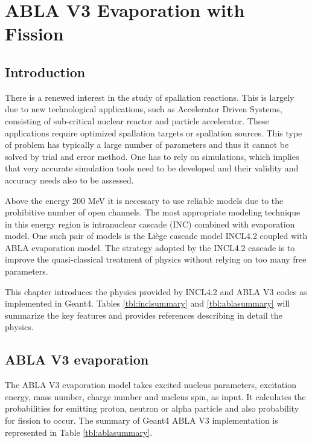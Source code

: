\chapter{ABLA V3 Evaporation with Fission}

\section{Introduction}

There is a renewed interest in the study of spallation reactions. This
is largely due to new technological applications, such as Accelerator
Driven Systems, consisting of sub-critical nuclear reactor and
particle accelerator. These applications require optimized spallation
targets or spallation sources. This type of problem has typically a large number
of parameters and thus it cannot be solved by trial and error
method. One has to rely on simulations, which implies that very
accurate simulation tools need to be developed and their validity and
accuracy needs also to be assessed.

Above the energy 200 MeV it is necessary to use reliable models due to
the prohibitive number of open channels. The most appropriate modeling
technique in this energy region is intranuclear cascade (INC) combined
with evaporation model. One such pair of models is the Li\`ege cascade
model INCL4.2 coupled with ABLA evaporation model. The strategy adopted
by the INCL4.2 cascade is to improve the quasi-classical treatment of
physics without relying on too many free parameters. 

This chapter introduces the physics provided by INCL4.2 and ABLA V3 codes as implemented in Geant4.
Tables \ref{tbl:inclsummary} and \ref{tbl:ablasummary} will summarize the key features 
and provides references describing in detail the physics.


\section{ABLA V3 evaporation}

The ABLA V3 evaporation model takes excited nucleus parameters,
excitation energy, mass number, charge number and nucleus spin, as
input. It calculates the probabilities for emitting proton, neutron or
alpha particle and also probability for fission to occur. 
The summary of Geant4 ABLA V3 implementation is represented in Table \ref{tbl:ablasummary}.


